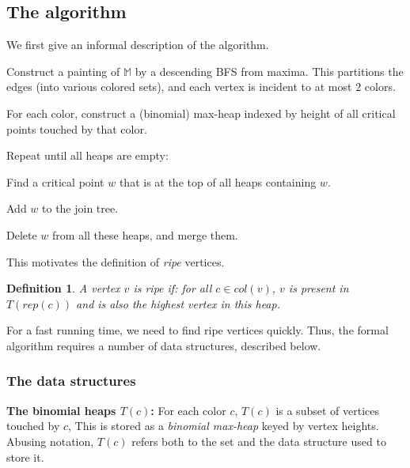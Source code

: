 \documentclass[11pt]{article}
\newtheorem{definition}[theorem]{Definition}
\theoremstyle{definition}
\newcommand{\MM}{\mathbb{M}}
\newcommand{\col}{col}
\newcommand{\fcol}{full}
\newcommand{\rep}{rep}
\newcommand{\touch}{T}
\begin{document}
\subsection{The algorithm} \label{sec:algo}

We first give an informal description of the algorithm.

\medskip

\begin{compactenum}
    \item Construct a painting of $\MM$ by a descending BFS 
    from maxima. This partitions the edges (into various colored
    sets), and each vertex is incident to at most $2$ colors.
    \item For each color, construct a (binomial) max-heap
    indexed by height of all critical points touched by that color.
    \item Repeat until all heaps are empty:
    \begin{compactenum}
        \item Find a critical point $w$ that is at the top
        of all heaps containing $w$.
        \item Add $w$ to the join tree. 
        \item Delete $w$ from all these heaps, and merge them.
    \end{compactenum}
\end{compactenum}

\medskip

\noindent
This motivates the definition of \emph{ripe} vertices.

\begin{definition} \label{def:ripe} A vertex $v$ is \emph{ripe} if: for all $c \in \col(v)$, $v$
is present in $T(\rep(c))$ and is also the highest vertex in this heap. 
\end{definition} 

For a fast running time, we need to find ripe vertices
quickly. Thus, the formal algorithm requires a 
number of data structures, described below. 

\subsubsection{The data structures} \label{sec:struct}
\noindent
{\bf The binomial heaps $\touch(c)$:} For each color $c$, $\touch(c)$ is a subset of vertices touched by $c$,
This is stored as a \emph{binomial max-heap} keyed by vertex heights. Abusing notation, $\touch(c)$ refers
both to the set and the data structure used to store it.
\end{document}
